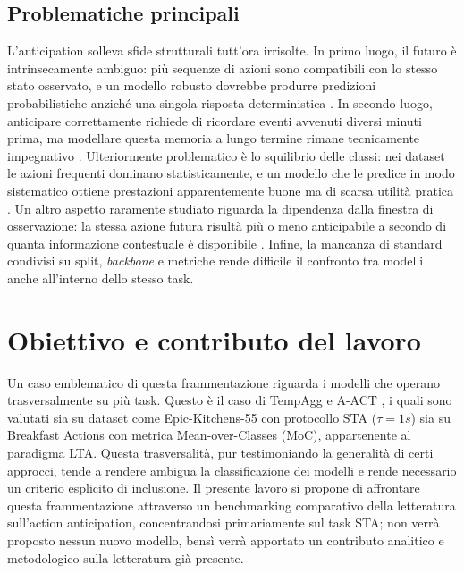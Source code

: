 \subsection{Problematiche principali}
L'anticipation solleva sfide strutturali tutt'ora irrisolte. In primo luogo, il futuro è intrinsecamente ambiguo: più sequenze di azioni sono compatibili con lo stesso stato osservato, e un modello robusto dovrebbe produrre predizioni probabilistiche anziché una singola risposta deterministica \cite{mittal2024can}. In secondo luogo, anticipare correttamente richiede di ricordare eventi avvenuti diversi minuti prima, ma modellare questa memoria a lungo termine rimane tecnicamente impegnativo \cite{lai2024human}. Ulteriormente problematico è lo squilibrio delle classi: nei dataset le azioni frequenti dominano statisticamente, e un modello che le predice in modo sistematico ottiene prestazioni apparentemente buone ma di scarsa utilità pratica \cite{damen2022rescaling}. Un altro aspetto raramente studiato riguarda la dipendenza dalla finestra di osservazione: la stessa azione futura risultà più o meno anticipabile a secondo di quanta informazione contestuale è disponibile \cite{furnari2022towards}. Infine, la mancanza di standard condivisi su split, \textit{backbone} e metriche rende difficile il confronto tra modelli anche all'interno dello stesso task.

\section{Obiettivo e contributo del lavoro}
Un caso emblematico di questa frammentazione riguarda i modelli che operano trasversalmente su più task. Questo è il caso di TempAgg \cite{sener2021technical, sener2020temporal} e A-ACT \cite{gupta2022act}, i quali sono valutati sia su dataset come Epic-Kitchens-55 \cite{damen2018scaling} con protocollo STA (\(\tau = 1 s\)) sia su Breakfast Actions \cite{kuehne2014language} con metrica Mean-over-Classes (MoC), appartenente al paradigma LTA.  Questa trasversalità, pur testimoniando la generalità di certi approcci, tende a rendere ambigua la classificazione dei modelli e rende necessario un criterio esplicito di inclusione. 
Il presente lavoro si propone di affrontare questa frammentazione attraverso un benchmarking comparativo della letteratura sull'action anticipation, concentrandosi primariamente sul task STA; non verrà proposto nessun nuovo modello, bensì verrà apportato un contributo analitico e metodologico sulla letteratura già presente.


